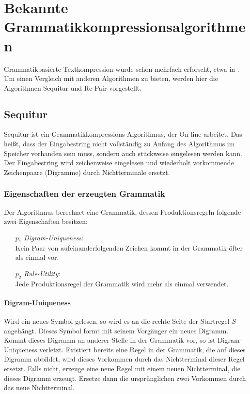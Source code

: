 \chapter{Bekannte Grammatikkompressionsalgorithmen}
\label{algorithmen}

Grammatikbasierte Textkompression wurde schon mehrfach erforscht, etwa in \cite{nevill-manning_identifying_1997, larsson_offline_1999, apostolico_off-line_2000}. Um einen Vergleich mit anderen Algorithmen zu bieten, werden hier die Algorithmen Sequitur \cite{nevill-manning_identifying_1997} und Re-Pair \cite{larsson_offline_1999} vorgestellt.

\section{Sequitur}
\label{sequitur}

Sequitur \cite{nevill-manning_identifying_1997} ist ein Grammatikkompressions-Algorithmus, der On-line arbeitet. Das heißt, dass der Eingabestring nicht vollständig zu Anfang des Algorithmus im Speicher vorhanden sein muss, sondern auch stückweise eingelesen werden kann. Der Eingabestring wird zeichenweise eingelesen und wiederholt vorkommende Zeichenpaare (Digramme) durch Nichtterminale ersetzt.

\subsection{Eigenschaften der erzeugten Grammatik}

Der Algorithmus berechnet eine Grammatik, dessen Produktionsregeln folgende zwei Eigenschaften besitzen:
\begin{enumerate}
	\item[$p_1$] \emph{Digram-Uniqueness}:\\
	Kein Paar von aufeinanderfolgenden Zeichen kommt in der Grammatik öfter als einmal vor.
	\item[$p_2$] \emph{Rule-Utility}:\\
	Jede Produktionsregel der Grammatik wird mehr als einmal verwendet.
\end{enumerate}

\subsubsection{Digram-Uniqueness}

Wird ein neues Symbol gelesen, so wird es an die rechte Seite der Startregel $S$ angehängt. Dieses Symbol formt mit seinem Vorgänger ein neues Digramm. Kommt dieses Digramm an anderer Stelle in der Grammatik vor, so ist Digram-Uniqueness verletzt. 
Existiert bereits eine Regel in der Grammatik, die auf dieses Digramm abbildet, wird dieses Vorkommen durch das Nichtterminal dieser Regel ersetzt. 
Falls nicht, erzeuge eine neue Regel mit einem neuen Nichtterminal, die dieses Digramm erzeugt. Ersetze dann die ursprünglichen zwei Vorkommen durch das neue Nichtterminal.

